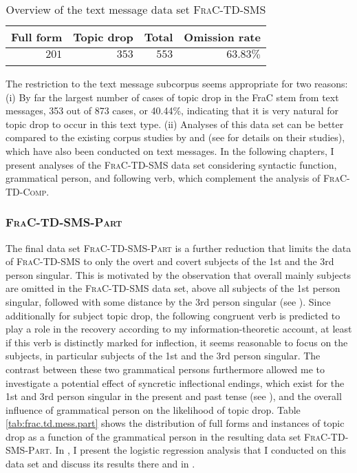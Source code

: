 \begin{table}
\centering
\caption{Overview of the text message data set \textsc{FraC-TD-SMS}}
\begin{tabular}{rrrr}
\lsptoprule
Full form & Topic drop & Total & Omission rate\\
\midrule
$201$ & $353$ & $553$ & $63.83\%$ \\
\lspbottomrule
\end{tabular}
\label{tab:message.data.fraC}
\end{table}

\noindent
The restriction to the text message subcorpus seems appropriate for two reasons:
(i) By far the largest number of cases of topic drop in the FraC stem from text messages, 353 out of 873 cases, or 40.44\%, indicating that it is very natural for topic drop to occur in this text type. 
(ii) Analyses of this data set can be better compared to the existing corpus studies by \citet{androutsopoulos.schmidt2002} and \citet{frick2017} (see  for details on their studies), which have also been conducted on text messages.
In the following chapters, I present analyses of the \textsc{FraC-TD-SMS} data set considering syntactic function, grammatical person, and following verb, which complement the analysis of \textsc{FraC-TD-Comp}.

\subsubsection{\textsc{FraC-TD-SMS-Part}}\label{sec:corpus.sms.part}
The final data set \textsc{FraC-TD-SMS-Part} is a further reduction that limits the data of \textsc{FraC-TD-SMS} to only the overt and covert subjects of the 1st and the 3rd person singular.
This is motivated by the observation that overall mainly subjects are omitted in the \textsc{FraC-TD-SMS} data set, above all subjects of the 1st person singular, followed with some distance by the 3rd person singular (see ).
Since additionally for subject topic drop, the following congruent verb is predicted to play a role in the recovery  according to my information-theoretic account, at least if this verb is distinctly marked for inflection,  it seems reasonable to focus on the subjects, in particular subjects of the 1st and the 3rd person singular.
The contrast between these two grammatical persons furthermore allowed me to investigate a potential effect of syncretic inflectional endings,  which exist for the 1st and 3rd person singular in the present and past tense (see ), and the overall influence of grammatical person on the likelihood of topic drop.
Table \ref{tab:frac.td.mess.part} shows the distribution of full forms and instances of topic drop as a function of the grammatical person in the resulting data set \textsc{FraC-TD-SMS-Part}.
In , I present the logistic regression analysis that I conducted on this data set and discuss its results there and in .

